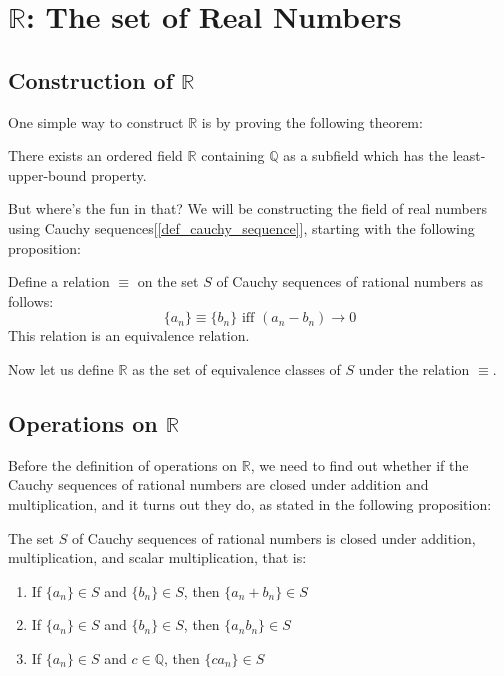 \documentclass{report}
\begin{document}
	\section{$\mathbb{R}$: The set of Real Numbers}
		\subsection{Construction of $\mathbb{R}$}
			One simple way to construct $\mathbb{R}$ is by proving the following theorem:
			
			\begin{thm} \label{thm_existence_real_number}
				There exists an ordered field $\mathbb{R}$ containing $\mathbb{Q}$ as a subfield which has the least-upper-bound property.
			\end{thm}
		
			But where's the fun in that? We will be constructing the field of real numbers using Cauchy sequences[\ref{def_cauchy_sequence}], starting with the following proposition:
		
			\begin{thm} \label{def_R_equiv_class}
				Define a relation $\equiv$ on the set $S$ of Cauchy sequences of rational numbers as follows:
				\begin{displaymath}
					\{a_n\} \equiv \{b_n\} \text{   iff   } (a_n-b_n)\rightarrow 0
				\end{displaymath}
				This relation is an equivalence relation.
			\end{thm}
		
			Now let us define $\mathbb{R}$ as the set of equivalence classes of $S$ under the relation $\equiv$.

		\subsection{Operations on $\mathbb{R}$}
		
			Before the definition of operations on $\mathbb{R}$, we need to find out whether if the Cauchy sequences of rational numbers are closed under addition and multiplication, and it turns out they do, as stated in the following proposition:
		
			\begin{prop}
				The set $S$ of Cauchy sequences of rational numbers is closed under addition, multiplication, and scalar multiplication, that is:
				\begin{enumerate}
					\item If $\{a_n\}\in S$ and $\{b_n\}\in S$, then $\{a_n+b_n\}\in S$
					\item If $\{a_n\}\in S$ and $\{b_n\}\in S$, then $\{a_nb_n\}\in S$
					\item If $\{a_n\}\in S$ and $c \in \mathbb{Q}$, then $\{ca_n\}\in S$
				\end{enumerate}
			\end{prop}
		
\end{document}
